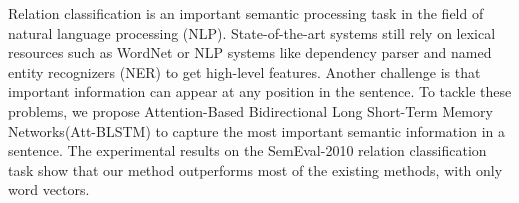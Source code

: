 Relation classification is an important semantic processing task in the field of natural language processing (NLP). State-of-the-art systems still rely on lexical resources such as WordNet or NLP systems like dependency parser and named entity recognizers (NER) to get high-level features. Another challenge is that important information can appear at any position in the sentence. To tackle these problems, we propose Attention-Based Bidirectional Long Short-Term Memory Networks(Att-BLSTM) to capture the most important semantic information in a sentence. The experimental results on the SemEval-2010 relation classification task show that our method outperforms most of the existing methods, with only word vectors.
